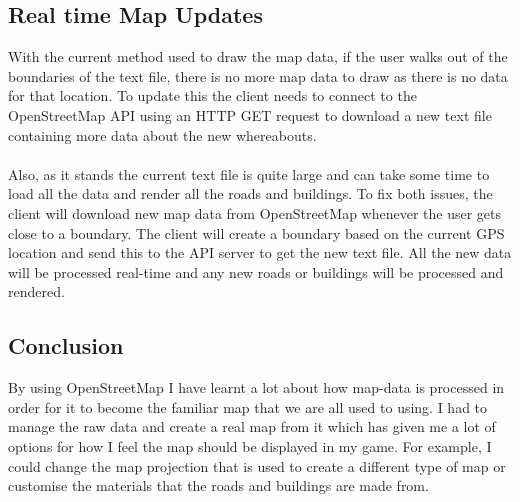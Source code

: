 \documentclass[a4paper]{report}
\begin{document}
\subsection{Real time Map Updates}
With the current method used to draw the map data, if the user walks out of the boundaries of the text file, there is no more map data to draw as there is no data for that location. To update this the client needs to connect to the OpenStreetMap API using an HTTP GET request to download a new text file containing more data about the new whereabouts.
\\\\
Also, as it stands the current text file is quite large and can take some time to load all the data and render all the roads and buildings. To fix both issues, the client will download new map data from OpenStreetMap whenever the user gets close to a boundary. The client will create a boundary based on the current GPS location and send this to the API server to get the new text file. All the new data will be processed real-time and any new roads or buildings will be processed and rendered.

\subsection{Conclusion}
By using OpenStreetMap I have learnt a lot about how map-data is processed in order for it to become the familiar map that we are all used to using. I had to manage the raw data and create a real map from it which has given me a lot of options for how I feel the map should be displayed in my game. For example, I could change the map projection that is used to create a different type of map or customise the materials that the roads and buildings are made from. 
\end{document}
